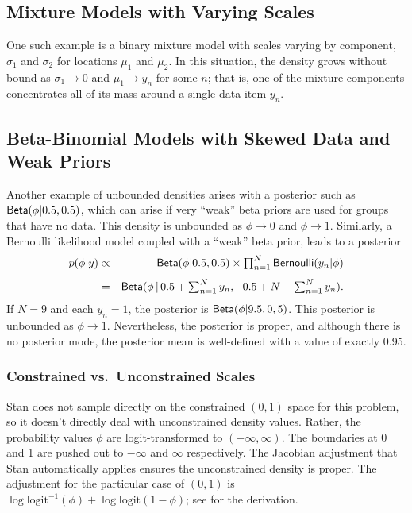 \subsection{Mixture Models with Varying Scales}

One such example is a binary mixture model with scales varying by
component, $\sigma_1$ and $\sigma_2$ for locations $\mu_1$ and
$\mu_2$. In this situation, the density grows without bound as
$\sigma_1 \rightarrow 0$ and $\mu_1 \rightarrow y_n$ for some $n$;
that is, one of the mixture components concentrates all of its mass
around a single data item $y_n$.

\subsection{Beta-Binomial Models with Skewed Data and Weak Priors}

Another example of unbounded densities arises with a posterior such as
$\mbox{\sf Beta}(\phi|0.5,0.5)$, which can arise if very ``weak'' beta
priors are used for groups that have no data. This density is
unbounded as $\phi \rightarrow 0$ and $\phi \rightarrow 1$. Similarly,
a Bernoulli likelihood model coupled with a ``weak'' beta prior, leads
to a posterior
%
\begin{eqnarray*}
p(\phi|y)
& \propto & \textstyle
\mbox{\sf Beta}(\phi|0.5,0.5) \times \prod_{n=1}^N \mbox{\sf Bernoulli}(y_n|\phi)
\\[4pt]
& = &\textstyle
\mbox{\sf Beta}(\phi \, | \, 0.5 + \sum_{n=1}^N y_n, \ \ 0.5 + N - \sum_{n=1}^N y_n).
\end{eqnarray*}
%
If $N = 9$ and each $y_n = 1$, the posterior is
$\mbox{\sf Beta}(\phi|9.5,0,5)$.  This posterior is unbounded as $\phi
\rightarrow 1$.  Nevertheless, the posterior is proper, and although
there is no posterior mode, the posterior mean is well-defined with a
value of exactly 0.95.

\subsubsection{Constrained vs.\ Unconstrained Scales}

Stan does not sample directly on the constrained $(0,1)$ space for
this problem, so it doesn't directly deal with unconstrained density
values.  Rather, the probability values $\phi$ are logit-transformed
to $(-\infty,\infty)$.  The boundaries at 0 and 1 are pushed out to
$-\infty$ and $\infty$ respectively.  The Jacobian adjustment that
Stan automatically applies ensures the unconstrained density is
proper.  The adjustment for the particular case of $(0,1)$ is $\log
\mbox{logit}^{-1}(\phi) + \log \mbox{logit}(1 - \phi)$; see
 for the derivation.

